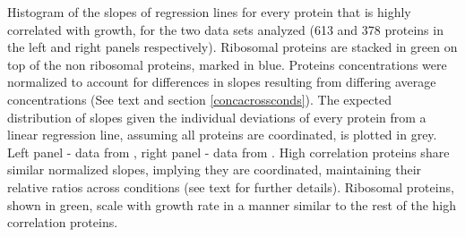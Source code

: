 \label{fig:globalfit}
    Histogram of the slopes of regression lines for every protein that is highly correlated with growth, for the two data sets analyzed (613 and 378 proteins in the left and right panels respectively).
    Ribosomal proteins are stacked in green on top of the non ribosomal proteins, marked in blue.
    Proteins concentrations were normalized to account for differences in slopes resulting from differing average concentrations (See text and section \ref{concacrossconds}).
    The expected distribution of slopes given the individual deviations of every protein from a linear regression line, assuming all proteins are coordinated, is plotted in grey.
    Left panel - data from \cite{Heinemann2015}, right panel - data from \cite{Valgepea2013}.
    High correlation proteins share similar normalized slopes, implying they are coordinated, maintaining their relative ratios across conditions (see text for further details).
    Ribosomal proteins, shown in green, scale with growth rate in a manner similar to the rest of the high correlation proteins.
